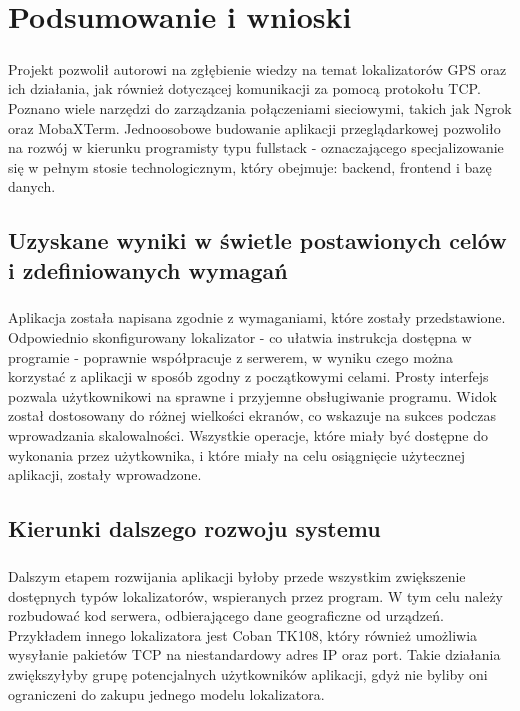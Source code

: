 \chapter{Podsumowanie i wnioski}

\paragraph{}
Projekt pozwolił autorowi na zgłębienie wiedzy na temat lokalizatorów GPS oraz ich działania, jak również dotyczącej komunikacji za pomocą protokołu TCP. Poznano wiele narzędzi do zarządzania połączeniami sieciowymi, takich jak Ngrok oraz MobaXTerm. Jednoosobowe budowanie aplikacji przeglądarkowej pozwoliło na rozwój w kierunku programisty typu fullstack - oznaczającego specjalizowanie się w pełnym stosie technologicznym, który obejmuje: backend, frontend i bazę danych.

\section{Uzyskane wyniki w świetle postawionych celów i zdefiniowanych wymagań}
\paragraph{}
Aplikacja została napisana zgodnie z wymaganiami, które zostały przedstawione. Odpowiednio skonfigurowany lokalizator - co ułatwia instrukcja dostępna w programie - poprawnie współpracuje z serwerem, w wyniku czego można korzystać z aplikacji w sposób zgodny z początkowymi celami. Prosty interfejs pozwala użytkownikowi na sprawne i przyjemne obsługiwanie programu. Widok został dostosowany do różnej wielkości ekranów, co wskazuje na sukces podczas wprowadzania skalowalności. Wszystkie operacje, które miały być dostępne do wykonania przez użytkownika, i które miały na celu osiągnięcie użytecznej aplikacji, zostały wprowadzone.

\section{Kierunki dalszego rozwoju systemu}
\paragraph{}
Dalszym etapem rozwijania aplikacji byłoby przede wszystkim zwiększenie dostępnych typów lokalizatorów, wspieranych przez program. W tym celu należy rozbudować kod serwera, odbierającego dane geograficzne od urządzeń. Przykładem innego lokalizatora jest Coban TK108, który również umożliwia wysyłanie pakietów TCP na niestandardowy adres IP oraz port. Takie działania zwiększyłyby grupę potencjalnych użytkowników aplikacji, gdyż nie byliby oni ograniczeni do zakupu jednego modelu lokalizatora.
